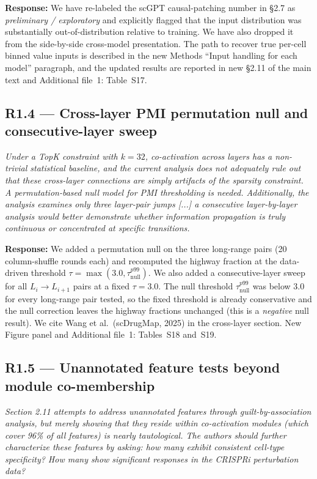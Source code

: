 \documentclass[11pt]{article}
\newcommand{\reviewercomment}[1]{\textit{\color{gray}#1}}
\newcommand{\response}[1]{\textbf{Response:} #1}
\begin{document}
\response{We have re-labeled the scGPT causal-patching number in \S2.7 as \emph{preliminary / exploratory} and explicitly flagged that the input distribution was substantially out-of-distribution relative to training. We have also dropped it from the side-by-side cross-model presentation. The path to recover true per-cell binned value inputs is described in the new Methods ``Input handling for each model'' paragraph, and the updated results are reported in new \S2.11 of the main text and Additional file~1: Table~S17.}

\subsection*{R1.4 --- Cross-layer PMI permutation null and consecutive-layer sweep}
\reviewercomment{Under a TopK constraint with $k{=}32$, co-activation across layers has a non-trivial statistical baseline, and the current analysis does not adequately rule out that these cross-layer connections are simply artifacts of the sparsity constraint. A permutation-based null model for PMI thresholding is needed. Additionally, the analysis examines only three layer-pair jumps [...] a consecutive layer-by-layer analysis would better demonstrate whether information propagation is truly continuous or concentrated at specific transitions.}

\response{We added a permutation null on the three long-range pairs (20 column-shuffle rounds each) and recomputed the highway fraction at the data-driven threshold $\tau = \max(3.0, \tau_{\text{null}}^{p99})$. We also added a consecutive-layer sweep for all $L_i \to L_{i+1}$ pairs at a fixed $\tau{=}3.0$. The null threshold $\tau_{\text{null}}^{p99}$ was below 3.0 for every long-range pair tested, so the fixed threshold is already conservative and the null correction leaves the highway fractions unchanged (this is a \emph{negative} null result). We cite Wang et al.\ (scDrugMap, 2025) in the cross-layer section. New Figure panel and Additional file~1: Tables~S18 and~S19.}

\subsection*{R1.5 --- Unannotated feature tests beyond module co-membership}
\reviewercomment{Section 2.11 attempts to address unannotated features through guilt-by-association analysis, but merely showing that they reside within co-activation modules (which cover 96\% of all features) is nearly tautological. The authors should further characterize these features by asking: how many exhibit consistent cell-type specificity? How many show significant responses in the CRISPRi perturbation data?}
\end{document}
